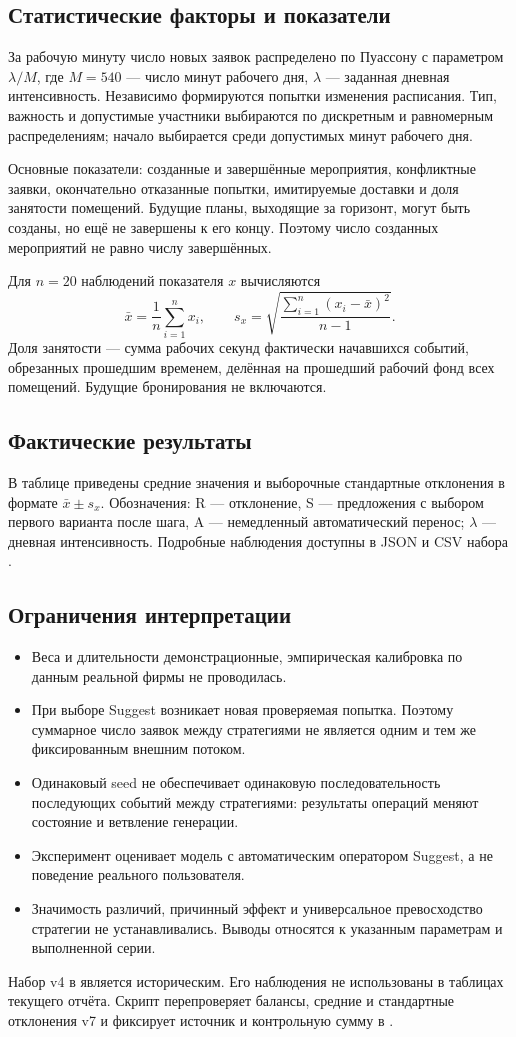 \subsection{Статистические факторы и показатели}
За рабочую минуту число новых заявок распределено по Пуассону с параметром $\lambda/M$, где $M=540$ --- число минут рабочего дня, $\lambda$ --- заданная дневная интенсивность. Независимо формируются попытки изменения расписания. Тип, важность и допустимые участники выбираются по дискретным и равномерным распределениям; начало выбирается среди допустимых минут рабочего дня.

Основные показатели: созданные и завершённые мероприятия, конфликтные заявки, окончательно отказанные попытки, имитируемые доставки и доля занятости помещений. Будущие планы, выходящие за горизонт, могут быть созданы, но ещё не завершены к его концу. Поэтому число созданных мероприятий не равно числу завершённых.

Для $n=20$ наблюдений показателя $x$ вычисляются
\[
 \bar x=\frac1n\sum_{i=1}^{n}x_i,\qquad
 s_x=\sqrt{\frac{\sum_{i=1}^{n}(x_i-\bar x)^2}{n-1}}.
\]
Доля занятости --- сумма рабочих секунд фактически начавшихся событий, обрезанных прошедшим временем, делённая на прошедший рабочий фонд всех помещений. Будущие бронирования не включаются.

\subsection{Фактические результаты}
В таблице приведены средние значения и выборочные стандартные отклонения в формате $\bar x\pm s_x$. Обозначения: R --- отклонение, S --- предложения с выбором первого варианта после шага, A --- немедленный автоматический перенос; $\lambda$ --- дневная интенсивность. Подробные наблюдения доступны в JSON и CSV набора .



\subsection{Ограничения интерпретации}
\begin{itemize}
\item Веса и длительности демонстрационные, эмпирическая калибровка по данным реальной фирмы не проводилась.
\item При выборе Suggest возникает новая проверяемая попытка. Поэтому суммарное число заявок между стратегиями не является одним и тем же фиксированным внешним потоком.
\item Одинаковый seed не обеспечивает одинаковую последовательность последующих событий между стратегиями: результаты операций меняют состояние и ветвление генерации.
\item Эксперимент оценивает модель с автоматическим оператором Suggest, а не поведение реального пользователя.
\item Значимость различий, причинный эффект и универсальное превосходство стратегии не устанавливались. Выводы относятся к указанным параметрам и выполненной серии.
\end{itemize}

Набор v4 в  является историческим. Его наблюдения не использованы в таблицах текущего отчёта. Скрипт  перепроверяет балансы, средние и стандартные отклонения v7 и фиксирует источник и контрольную сумму в .
